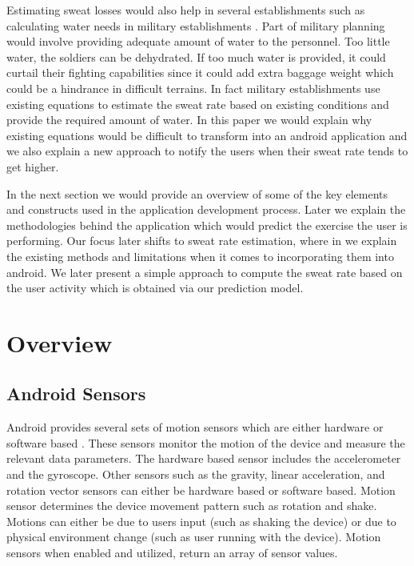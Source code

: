 \documentclass[conference]{IEEEtran}
\begin{document}
Estimating sweat losses would also help in several establishments such as calculating water needs in military establishments \cite{ref10} . Part of military planning would involve providing adequate amount of water to the personnel. Too little water, the soldiers can be dehydrated. If too much water is provided, it could curtail their fighting capabilities since it could add extra baggage weight which could be a hindrance in difficult terrains. In fact military establishments use existing equations to estimate the sweat rate based on existing conditions and provide the required amount of water. In this paper we would explain why existing equations would be difficult to transform into an android application and we also explain a new approach to notify the users when their sweat rate tends to get higher.

In the next section we would provide an overview of some of the key elements and constructs used in the application development process. Later we explain the methodologies behind the application which would predict the exercise the user is performing. Our focus later shifts to sweat rate estimation, where in we explain the existing methods and limitations when it comes to incorporating them into android. We later present a simple approach to compute the sweat rate based on the user activity which is obtained via our prediction model.

\section{Overview}

\subsection{Android Sensors}

Android provides several sets of motion sensors which are either hardware or software based \cite{ref11} . These sensors monitor the motion of the device and measure the relevant data parameters. The hardware based sensor includes the accelerometer and the gyroscope. Other sensors such as the gravity, linear acceleration, and rotation vector sensors can either be hardware based or software based. Motion sensor determines the device movement pattern such as rotation and shake. Motions can either be due to users input (such as shaking the device) or due to physical environment change (such as user running with the device). Motion sensors when enabled and utilized, return an array of sensor values.
\end{document}
